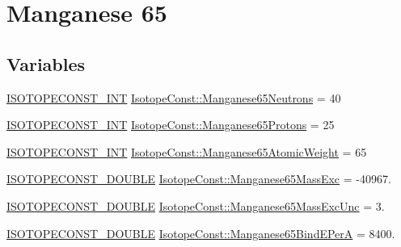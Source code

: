 \hypertarget{group___isotope_const-_manganese-_mn65}{}\section{Manganese 65}
\label{group___isotope_const-_manganese-_mn65}
\subsection*{Variables}
\begin{DoxyCompactItemize}
\item 
\mbox{\hyperlink{group___isotope_const-_macros_ga5f18360b3e99483a35c32d789e62621c}{I\+S\+O\+T\+O\+P\+E\+C\+O\+N\+S\+T\+\_\+\+I\+NT}} \mbox{\hyperlink{group___isotope_const-_manganese-_mn65_ga1a5b5ff3040818a7e969b45ac431f825}{Isotope\+Const\+::\+Manganese65\+Neutrons}} = 40
\item 
\mbox{\hyperlink{group___isotope_const-_macros_ga5f18360b3e99483a35c32d789e62621c}{I\+S\+O\+T\+O\+P\+E\+C\+O\+N\+S\+T\+\_\+\+I\+NT}} \mbox{\hyperlink{group___isotope_const-_manganese-_mn65_ga3992a89c4d10f271c0f776741bf978fe}{Isotope\+Const\+::\+Manganese65\+Protons}} = 25
\item 
\mbox{\hyperlink{group___isotope_const-_macros_ga5f18360b3e99483a35c32d789e62621c}{I\+S\+O\+T\+O\+P\+E\+C\+O\+N\+S\+T\+\_\+\+I\+NT}} \mbox{\hyperlink{group___isotope_const-_manganese-_mn65_gad7095c0ec45ada90cb219eed190231ba}{Isotope\+Const\+::\+Manganese65\+Atomic\+Weight}} = 65
\item 
\mbox{\hyperlink{group___isotope_const-_macros_ga8f45a7272ce02c0b4c65c44636ed719a}{I\+S\+O\+T\+O\+P\+E\+C\+O\+N\+S\+T\+\_\+\+D\+O\+U\+B\+LE}} \mbox{\hyperlink{group___isotope_const-_manganese-_mn65_gad3a8be872dae0496e8b66706911ea179}{Isotope\+Const\+::\+Manganese65\+Mass\+Exc}} = -\/40967.
\item 
\mbox{\hyperlink{group___isotope_const-_macros_ga8f45a7272ce02c0b4c65c44636ed719a}{I\+S\+O\+T\+O\+P\+E\+C\+O\+N\+S\+T\+\_\+\+D\+O\+U\+B\+LE}} \mbox{\hyperlink{group___isotope_const-_manganese-_mn65_ga5963f55c23ece0f044e021bc37edea98}{Isotope\+Const\+::\+Manganese65\+Mass\+Exc\+Unc}} = 3.
\item 
\mbox{\hyperlink{group___isotope_const-_macros_ga8f45a7272ce02c0b4c65c44636ed719a}{I\+S\+O\+T\+O\+P\+E\+C\+O\+N\+S\+T\+\_\+\+D\+O\+U\+B\+LE}} \mbox{\hyperlink{group___isotope_const-_manganese-_mn65_gaaf7269dd7782c4f23d0b38ec8964f6c5}{Isotope\+Const\+::\+Manganese65\+Bind\+E\+PerA}} = 8400.
\item 

\end{DoxyCompactItemize}
